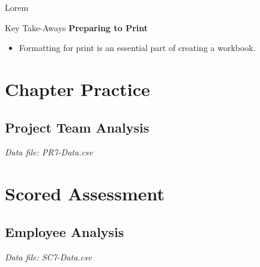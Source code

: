 Lorem 

\begin{center}
	\begin{tkwbox}{Key Take-Aways}
		\textbf{Preparing to Print}
		\\
		\begin{itemize}
			\setlength{\itemsep}{0pt}
			\setlength{\parskip}{0pt}
			\setlength{\parsep}{0pt}
			
			\item Formatting for print is an essential part of creating a workbook.
			
		\end{itemize}
	\end{tkwbox}
\end{center}

\section{Chapter Practice}

\subsection{Project Team Analysis}

\textit{Data file: PR7-Data.csv}


\section{Scored Assessment}

\subsection{Employee Analysis}

\textit{Data file: SC7-Data.csv}

